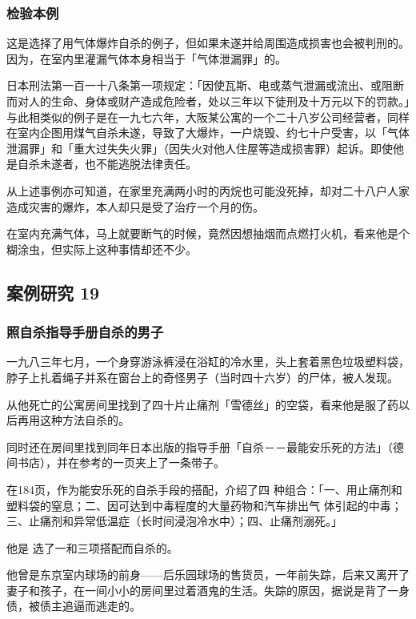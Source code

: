 \documentclass[UTF8]{ctexart}
\begin{document}
\subsubsection*{检验本例}

这是选择了用气体爆炸自杀的例子，但如果未遂并给周围造成损害也会被判刑的。
因为，在室内里灌漏气体本身相当于「气体泄漏罪」的。

日本刑法第一百一十八条第一项规定：「因使瓦斯、电或蒸气泄漏或流出、或阻断而对人的生命、身体或财产造成危险者，处以三年以下徒刑及十万元以下的罚款。」与此相类似的例子是在一九七六年，大阪某公寓的一个二十八岁公司经营者，同样在室内企图用煤气自杀未遂，导致了大爆炸，一户烧毁、约七十户受害，以「气体泄漏罪」和「重大过失失火罪」（因失火对他人住屋等造成损害罪）起诉。即使他是自杀未遂者，也不能逃脱法律责任。

从上述事例亦可知道，在家里充满两小时的丙烷也可能没死掉，却对二十八户人家造成灾害的爆炸，本人却只是受了治疗一个月的伤。

在室内充满气体，马上就要断气的时候，竟然因想抽烟而点燃打火机，看来他是个糊涂虫，但实际上这种事情却还不少。

\subsection{案例研究 19}

\subsubsection*{照自杀指导手册自杀的男子}

一九八三年七月，一个身穿游泳裤浸在浴缸的冷水里，头上套着黑色垃圾塑料袋，脖子上扎着绳子并系在窗台上的奇怪男子（当时四十六岁）的尸体，被人发现。

从他死亡的公寓房间里找到了四十片止痛剂「雪德丝」的空袋，看来他是服了药以后再用这种方法自杀的。

同时还在房间里找到同年日本出版的指导手册「自杀－－最能安乐死的方法」（德间书店），并在参考的一页夹上了一条带子。

在184页，作为能安乐死的自杀手段的搭配，介绍了四 种组合：「一、用止痛剂和塑料袋的窒息；二、因可达到中毒程度的大量药物和汽车排出气 体引起的中毒；三、止痛剂和异常低温症（长时间浸泡冷水中）；四、止痛剂溺死。」

他是 选了一和三项搭配而自杀的。 

他曾是东京室内球场的前身——后乐园球场的售货员，一年前失踪，后来又离开了妻子和孩子，在一间小小的房间里过着酒鬼的生活。失踪的原因，据说是背了一身债，被债主追逼而逃走的。
\end{document}
